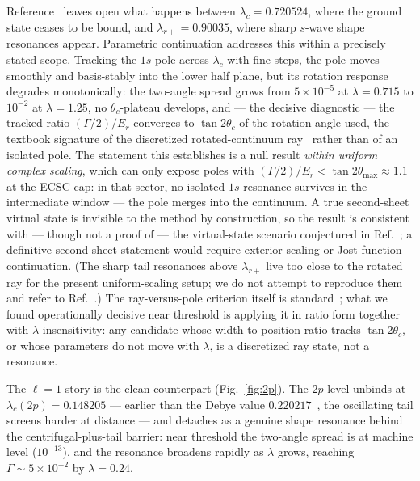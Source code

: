 \documentclass[aps,pre,twocolumn,superscriptaddress,floatfix,longbibliography]{revtex4-2}
\begin{document}
Reference~\cite{JiaoHo2021} leaves open what happens between
$\lambda_c=0.720524$, where the ground state ceases to be bound, and
$\lambda_{r+}=0.90035$, where sharp $s$-wave shape resonances
appear. Parametric continuation addresses this within a precisely
stated scope. Tracking the $1s$ pole across $\lambda_c$ with fine
steps, the pole moves smoothly and basis-stably into the lower half
plane, but its rotation response degrades monotonically: the
two-angle spread grows from $5\times10^{-5}$ at $\lambda=0.715$ to
$10^{-2}$ at $\lambda=1.25$, no $\theta_c$-plateau develops, and
--- the decisive diagnostic --- the tracked ratio $(\Gamma/2)/E_r$
converges to $\tan2\theta_c$ of the rotation angle used, the
textbook signature of the discretized rotated-continuum
ray~\cite{Reinhardt1982,Ho1983,Moiseyev1998} rather than of an
isolated pole. The statement this establishes is a null result
\emph{within uniform complex scaling}, which can only expose poles
with $(\Gamma/2)/E_r<\tan2\theta_{\max}\approx1.1$ at the ECSC cap:
in that sector, no isolated $1s$ resonance survives in the
intermediate window --- the pole merges into the continuum. A true
second-sheet virtual state is invisible to the method by
construction, so the result is consistent with --- though not a
proof of --- the virtual-state scenario conjectured in
Ref.~\cite{JiaoHo2021}; a definitive second-sheet statement would
require exterior scaling or Jost-function continuation. (The sharp
tail resonances above $\lambda_{r+}$ live too close to the rotated
ray for the present uniform-scaling setup; we do not attempt to
reproduce them and refer to Ref.~\cite{JiaoHo2021}.) The
ray-versus-pole criterion itself is standard~\cite{Reinhardt1982,
Ho1983,Moiseyev1998}; what we found operationally decisive near
threshold is applying it in ratio form together with
$\lambda$-insensitivity: any candidate whose width-to-position
ratio tracks $\tan2\theta_c$, or whose parameters do not move with
$\lambda$, is a discretized ray state, not a resonance.

The $\ell=1$ story is the clean counterpart
(Fig.~\ref{fig:2p}). The $2p$ level unbinds at
$\lambda_c(2p)=0.148205$ --- earlier than the Debye value
$0.220217$~\cite{companionNR,JiaoCritical2021}, the oscillating
tail screens harder at distance --- and detaches as a genuine shape
resonance behind the centrifugal-plus-tail barrier: near threshold
the two-angle spread is at machine level ($10^{-13}$), and the
resonance broadens rapidly as $\lambda$ grows, reaching
$\Gamma\sim\!5\times10^{-2}$ by $\lambda=0.24$.
\end{document}
